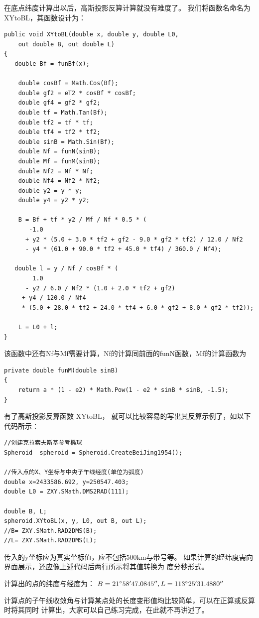 在底点纬度计算出以后，高斯投影反算计算就没有难度了。
我们将函数名命名为 XYtoBL，其函数设计为：
\begin{lstlisting}
public void XYtoBL(double x, double y, double L0,
    out double B, out double L)
{
   double Bf = funBf(x);

    double cosBf = Math.Cos(Bf);
    double gf2 = eT2 * cosBf * cosBf;
    double gf4 = gf2 * gf2;
    double tf = Math.Tan(Bf);
    double tf2 = tf * tf;
    double tf4 = tf2 * tf2;
    double sinB = Math.Sin(Bf);
    double Nf = funN(sinB);
    double Mf = funM(sinB);
    double Nf2 = Nf * Nf;
    double Nf4 = Nf2 * Nf2;
    double y2 = y * y;
    double y4 = y2 * y2;

    B = Bf + tf * y2 / Mf / Nf * 0.5 * (
       -1.0
      + y2 * (5.0 + 3.0 * tf2 + gf2 - 9.0 * gf2 * tf2) / 12.0 / Nf2
      - y4 * (61.0 + 90.0 * tf2 + 45.0 * tf4) / 360.0 / Nf4);

   double l = y / Nf / cosBf * (
        1.0
      - y2 / 6.0 / Nf2 * (1.0 + 2.0 * tf2 + gf2)
     + y4 / 120.0 / Nf4
     * (5.0 + 28.0 * tf2 + 24.0 * tf4 + 6.0 * gf2 + 8.0 * gf2 * tf2));

    L = L0 + l;
}
\end{lstlisting}

该函数中还有Nf与Mf需要计算，Nf的计算同前面的funN函数，Mf的计算函数为
\begin{lstlisting}
private double funM(double sinB)
{
    return a * (1 - e2) * Math.Pow(1 - e2 * sinB * sinB, -1.5);
}
\end{lstlisting}

有了高斯投影反算函数 XYtoBL， 就可以比较容易的写出其反算示例了，如以下代码所示：

\begin{lstlisting}
//创建克拉索夫斯基参考椭球
Spheroid  spheroid = Spheroid.CreateBeiJing1954();

//传入点的X、Y坐标与中央子午线经度(单位为弧度)
double x=2433586.692, y=250547.403;
double L0 = ZXY.SMath.DMS2RAD(111);

double B, L;
spheroid.XYtoBL(x, y, L0, out B, out L);
//B= ZXY.SMath.RAD2DMS(B);
//L= ZXY.SMath.RAD2DMS(L);
\end{lstlisting}

传入的y坐标应为真实坐标值，应不包括500km与带号等。
如果计算的经纬度需向界面展示，还应像上述代码后两行所示将其值转换为
度分秒形式。

计算出的点的纬度与经度为：
$B=21 ^\circ 58'47.0845'', L=113^\circ 25'31.4880''$

计算点的子午线收敛角与计算某点处的长度变形值均比较简单，可以在正算或反算时将其同时
计算出，大家可以自己练习完成，在此就不再讲述了。

